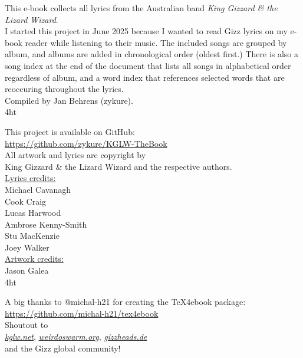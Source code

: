 \begin{center}
{%
\vspace*{\fill}%

This e-book collects all lyrics from the Australian band \emph{King Gizzard \& the Lizard Wizard}. \\[1em]
I started this project in June 2025 because I wanted to read Gizz lyrics on my e-book reader while listening to their music.
The included songs are grouped by album, and albums are added in chronological order (oldest first.)
There is also a song index at the end of the document that lists all songs in alphabetical order regardless of album,
and a word index that references selected words that are reoccuring throughout the lyrics. \\[1em]

Compiled by Jan Behrens (zykure). \\[1em]

\iftex4ht%
    \vfill%
    \newpage%
    \vspace*{\fill}%
\fi

This project is available on GitHub: \\
\href{https://github.com/zykure/KGLW-TheBook}{https://github.com/zykure/KGLW-TheBook} \\[2em]

All artwork and lyrics are copyright by \\
King Gizzard \& the Lizard Wizard and the respective authors. \\[2em]

\underline{Lyrics credits:} \\
Michael Cavanagh \\
Cook Craig \\
Lucas Harwood \\
Ambrose Kenny-Smith \\
Stu MacKenzie \\
Joey Walker \\[2em]

\underline{Artwork credits:} \\
Jason Galea \\[2em]

\iftex4ht%
    \vfill%
    \newpage%
    \vspace*{\fill}%
\fi

A big thanks to @michal-h21 for creating the TeX4ebook package: \\
\href{https://github.com/michal-h21/tex4ebook}{https://github.com/michal-h21/tex4ebook} \\[1em]

Shoutout to \\
\href{https://kglw.net}{\textit{kglw.net}}, \href{https://weirdoswarm.org}{\textit{weirdoswarm.org}}, \href{https://gizzheads.de}{\textit{gizzheads.de}} \\
and the Gizz global community! \\

\vfill%
}%
\end{center}
